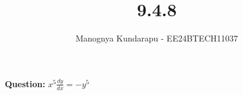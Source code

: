 \documentclass[journal]{IEEEtran}
\begin{document}

\vspace{3cm}

\title{9.4.8}
\author{Manognya Kundarapu - EE24BTECH11037
}
{\let\newpage\relax\maketitle}

\renewcommand{\thefigure}{\theenumi}
\renewcommand{\thetable}{\theenumi}
\setlength{\intextsep}{10pt} %


\renewcommand{\thetable}{\theenumi}

\textbf{Question:} $x^5\frac{dy}{dx}=-y^5$\\ 
\end{document}
